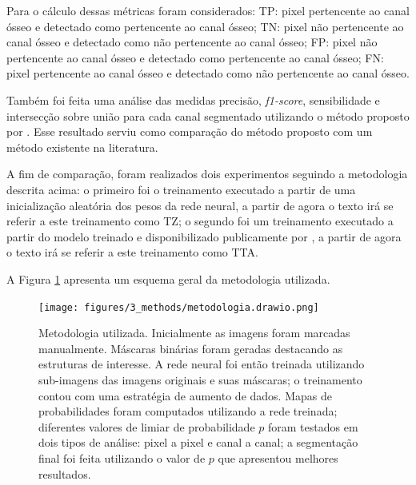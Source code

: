  Para o cálculo dessas métricas foram considerados: TP: pixel pertencente ao canal ósseo e detectado como pertencente ao canal ósseo; TN: pixel não pertencente ao canal ósseo e detectado como não pertencente ao canal ósseo; FP: pixel não pertencente ao canal ósseo e detectado como pertencente ao canal ósseo; FN: pixel pertencente ao canal ósseo e detectado como não pertencente ao canal ósseo.


Também foi feita uma análise das medidas precisão, \textit{f1-score}, sensibilidade e intersecção sobre união para cada canal segmentado utilizando o método proposto por \cite{gondim2021automatic}. Esse resultado serviu como comparação do método proposto com um método existente na literatura.

A fim de comparação, foram realizados dois experimentos seguindo a metodologia descrita acima: o primeiro foi o treinamento executado a partir de uma inicialização aleatória dos pesos da rede neural, a partir de agora o texto irá se referir a este treinamento como \acf{TZ}; o segundo foi um treinamento executado a partir do modelo treinado e disponibilizado publicamente por \cite{santos2022automated}, a partir de agora o texto irá se referir a este treinamento como \acf{TTA}. 


A Figura \ref{fig:methodology-schema} apresenta um esquema geral da metodologia utilizada.



\begin{landscape}

\begin{figure}[h]
    \center
    \texttt{[image: figures/3\_methods/metodologia.drawio.png]}   
  
    \caption[Diagrama do método proposto.]{Metodologia utilizada. Inicialmente as imagens foram marcadas manualmente. Máscaras binárias foram geradas destacando as estruturas de interesse. A rede neural foi então treinada utilizando sub-imagens das imagens originais e suas máscaras; o treinamento contou com uma estratégia de aumento de dados. Mapas de probabilidades foram computados utilizando a rede treinada; diferentes valores de limiar de probabilidade $p$ foram testados em dois tipos de análise: pixel a pixel e canal a canal; a segmentação final foi feita utilizando o valor de $p$ que apresentou melhores resultados. }
    \label{fig:methodology-schema}
\end{figure}

\end{landscape}

